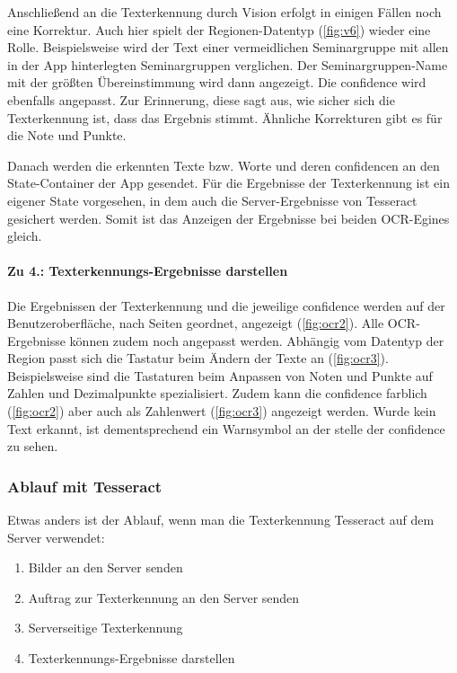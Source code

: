 \documentclass[nomenclature, oneside, 150]{HSMW-Thesis}
\begin{document}
				Anschließend an die Texterkennung durch Vision erfolgt in einigen Fällen noch eine Korrektur. Auch hier spielt der Regionen-Datentyp (\ref{fig:v6}) wieder eine Rolle. Beispielsweise wird der Text einer vermeidlichen Seminargruppe mit allen in der App hinterlegten Seminargruppen verglichen. Der Seminargruppen-Name mit der größten Übereinstimmung wird dann angezeigt. Die confidence wird ebenfalls angepasst. Zur Erinnerung, diese sagt aus, wie sicher sich die Texterkennung ist, dass das Ergebnis stimmt. Ähnliche Korrekturen gibt es für die Note und Punkte.
				
				Danach werden die erkennten Texte bzw. Worte und deren confidencen an den State-Container der App gesendet. Für die Ergebnisse der Texterkennung ist ein eigener State vorgesehen, in dem auch die Server-Ergebnisse von Tesseract gesichert werden. Somit ist das Anzeigen der Ergebnisse bei beiden OCR-Egines gleich.  
				
				\paragraph{Zu 4.: Texterkennungs-Ergebnisse darstellen}
				Die Ergebnissen der Texterkennung und die jeweilige confidence werden auf der Benutzeroberfläche, nach Seiten geordnet, angezeigt (\ref{fig:ocr2}). Alle OCR-Ergebnisse können zudem noch angepasst werden. Abhängig vom Datentyp der Region passt sich die Tastatur beim Ändern der Texte an (\ref{fig:ocr3}). Beispielsweise sind die Tastaturen beim Anpassen von Noten und Punkte auf Zahlen und Dezimalpunkte spezialisiert. Zudem kann die confidence farblich (\ref{fig:ocr2}) aber auch als Zahlenwert (\ref{fig:ocr3}) angezeigt werden. Wurde kein Text erkannt, ist dementsprechend ein Warnsymbol an der stelle der confidence zu sehen.    
 
			\subsubsection{Ablauf mit Tesseract}
				Etwas anders ist der Ablauf, wenn man die Texterkennung Tesseract auf dem Server verwendet:
				\begin{enumerate}
					\item Bilder an den Server senden
					\item Auftrag zur Texterkennung an den Server senden
					\item Serverseitige Texterkennung
					\item Texterkennungs-Ergebnisse darstellen
				\end{enumerate}
				
\end{document}
